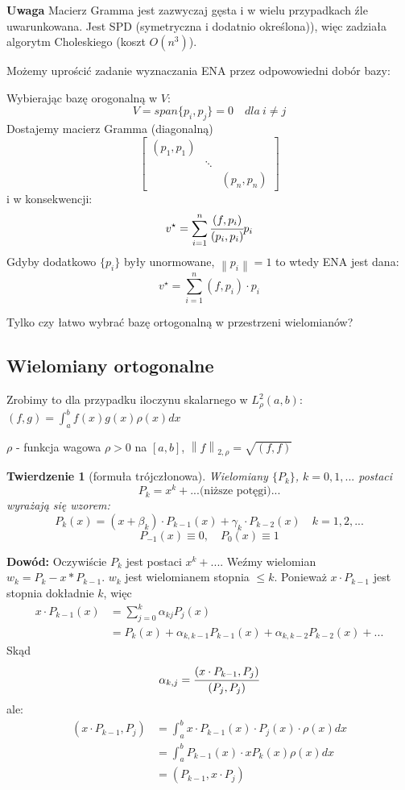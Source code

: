 \documentclass[hidelinks,a4paper,fleqn,oneside]{book}
\newcommand{\norm}[1]{\left\lVert#1\right\rVert}
\newtheorem{twierdz}{Twierdzenie}
\begin{document}
\textbf{Uwaga} Macierz Gramma jest zazwyczaj gęsta i w wielu przypadkach źle uwarunkowana. Jest SPD (symetryczna i dodatnio określona)), więc zadziała algorytm Choleskiego (koszt $O(n^3)$).

Możemy uprościć zadanie wyznaczania ENA przez odpowowiedni dobór bazy:

Wybierając bazę orogonalną w $V$:
\[
	V = span\{p_i, p_j\} = 0 \quad dla\ i \neq j
\]
Dostajemy macierz Gramma (diagonalną)
\[
	\left[
		\begin{array}{ccc}
		(p_1,p_1) &  &  \\
		 & \ddots & \\
		 &  & (p_n, p_n)
		\end{array}
	\right]
\]
i w konsekwencji:
\[
	v^\star = \sum_{i=1}^n \cfrac{(f, p_i)}{(p_i, p_i)}p_i
\]
Gdyby dodatkowo $\{p_i\}$ były unormowane, $\norm{p_i} = 1$ to wtedy ENA jest dana:
\[
	v^\star = \sum_{i=1}^{n}(f, p_i) \cdot p_i
\]

Tylko czy łatwo wybrać bazę ortogonalną w przestrzeni wielomianów?

\subsection{Wielomiany ortogonalne}

Zrobimy to dla przypadku iloczynu skalarnego w $L^2_\rho(a, b)$: $(f, g) = \int_a^b f(x)g(x)\rho(x)dx$

$\rho$ - funkcja wagowa $\rho > 0$ na $[a, b]$, $\norm{f}_{2, \rho} = \sqrt{(f, f)}$

\begin{twierdz}[formuła trójczłonowa]
	Wielomiany $\{P_k\}$, $k = 0, 1, ...$ postaci
	\[
		P_k = x^k + ...\textrm{(niższe potęgi)}...
	\]
	wyrażają się wzorem:
	\[
		P_k(x) = (x + \beta_k) \cdot P_{k-1}(x) + \gamma_k \cdot P_{k-2}(x) \quad k=1, 2, ...
	\]
	\[
		P_{-1}(x) \equiv 0, \quad P_0(x) \equiv 1
	\]
\end{twierdz}

\textbf{Dowód:} Oczywiście $P_k$ jest postaci $x^k + ...$. Weźmy wielomian $w_k = P_k - x * P_{k-1}$. $w_k$ jest wielomianem stopnia $\leq k$. Ponieważ $x \cdot P_{k-1}$ jest stopnia dokładnie $k$, więc 
\[
	\begin{array}{cc}
	x \cdot P_{k-1}(x) & = \sum_{j=0}^k \alpha_{kj} P_j(x) \\
		& = P_k(x) + \alpha_{k, k-1} P_{k-1}(x) + \alpha_{k, k-2}P_{k-2}(x) + ...
	\end{array}
\]
Skąd
\[
	\alpha_{k, j} = \cfrac{(x \cdot P_{k-1}, P_j)}{(P_j, P_j)}
\]
ale:
\[
	\begin{array}{cc}
		(x \cdot P_{k-1}, P_j) & = \int_a^b x \cdot P_{k-1}(x) \cdot P_j(x) \cdot \rho(x) dx \\
		& = \int_a^b P_{k-1}(x) \cdot x P_k(x) \rho (x) dx  \\
		& = (P_{k-1}, x\cdot P_j)
	\end{array}
\]
\end{document}
